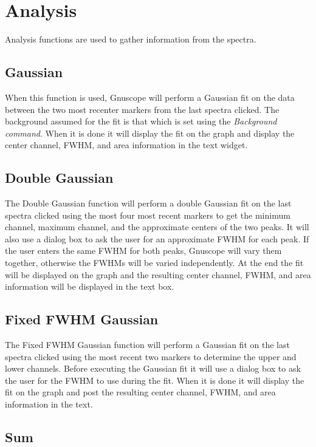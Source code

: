\section{Analysis}

Analysis functions are used to gather information from the spectra.

\subsection{Gaussian}

When this function is used, Gnuscope will perform a Gaussian fit on the data between the two most recenter markers from the last spectra clicked.  The background assumed for the fit is that which is set using the {\it Background command}.  When it is done it will display the fit on the graph and display the center channel, FWHM, and area information in the text widget.

\subsection{Double Gaussian}

The Double Gaussian function will perform a double Gaussian fit on the last spectra clicked using the most four most recent markers to get the minimum channel, maximum channel, and the approximate centers of the two peaks.  It will also use a dialog box to ask the user for an approximate FWHM for each peak.  If the user enters the same FWHM for both peaks, Gnuscope will vary them together, otherwise the FWHMs will be varied independently.  At the end the fit will be displayed on the graph and the resulting center channel, FWHM, and area information will be displayed in the text box.

\subsection{Fixed FWHM Gaussian}

The Fixed FWHM Gaussian function will perform a Gaussian fit on the last spectra clicked using the most recent two markers to determine the upper and lower channels.  Before executing the Gaussian fit it will use a dialog box to ask the user for the FWHM to use during the fit.  When it is done it will display the fit on the graph and post the resulting center channel, FWHM, and area information in the text.

\subsection{Sum}

